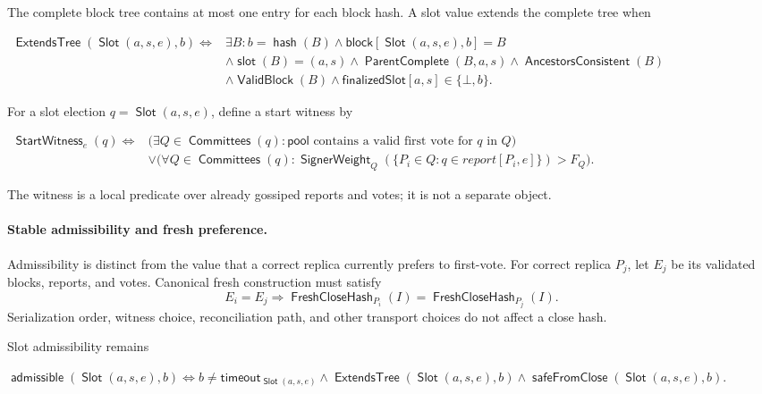 \documentclass[sigplan,twocolumn,review,anonymous]{acmart}
\newcommand{\func}[1]{\operatorname{\mathsf{#1}}}
\newcommand{\hash}{\func{hash}}
\newcommand{\Slot}{\func{Slot}}
\newcommand{\FreshCloseHash}{\func{FreshCloseHash}}
\newcommand{\admissible}{\func{admissible}}
\newcommand{\ExtendsTree}{\func{ExtendsTree}}
\newcommand{\ParentComplete}{\func{ParentComplete}}
\newcommand{\timeoutVal}{\mathsf{timeout}}
\newcommand{\blockMap}{\mathsf{block}}
\newcommand{\ValidBlock}{\func{ValidBlock}}
\newcommand{\slotOf}{\func{slot}}
\newcommand{\finalizedSlot}{\mathsf{finalizedSlot}}
\newcommand{\Committees}{\func{Committees}}
\newcommand{\safeFromClose}{\func{safeFromClose}}
\newcommand{\SignerWeight}{\func{SignerWeight}}
\begin{document}
The complete block tree contains at most one entry for each block hash.  A slot value extends the
complete tree when
\begin{center}
\begin{adjustbox}{max width=\columnwidth}
\(\displaystyle
\begin{aligned}
\ExtendsTree(\Slot(a,s,e),b)
\iff{}& \exists B: b=\hash(B)\wedge\blockMap[\Slot(a,s,e),b]=B\\
&\wedge\slotOf(B)=(a,s)\wedge\ParentComplete(B,a,s)
\wedge\func{AncestorsConsistent}(B)\\
&\wedge\ValidBlock(B)\wedge\finalizedSlot[a,s]\in\{\bot,b\}.
\end{aligned}
\)
\end{adjustbox}
\end{center}
For a slot election \(q=\Slot(a,s,e)\), define a start witness by
\begin{center}
\begin{adjustbox}{max width=\columnwidth}
\(\displaystyle
\begin{aligned}
\func{StartWitness}_e(q)\iff{}&
\bigl(\exists Q\in\Committees(q):\mathsf{pool}\text{ contains a valid first vote for }q\text{ in }Q\bigr)\\
&\vee\bigl(\forall Q\in\Committees(q):
\SignerWeight_Q(\{P_i\in Q:q\in report[P_i,e]\})>F_Q\bigr).
\end{aligned}
\)
\end{adjustbox}
\end{center}
The witness is a local predicate over already gossiped reports and votes; it is not a separate object.

\paragraph{Stable admissibility and fresh preference.}
Admissibility is distinct from the value that a correct replica currently prefers to first-vote.  For
correct replica \(P_j\), let \(E_j\) be its validated blocks, reports, and votes.  Canonical fresh
construction must satisfy
\[
E_i=E_j
\Longrightarrow
\FreshCloseHash_{P_i}(I)=\FreshCloseHash_{P_j}(I).
\]
Serialization order, witness choice, reconciliation path, and other transport choices do not affect a
close hash.

Slot admissibility remains
\begin{center}
\begin{adjustbox}{max width=\columnwidth}
\(\displaystyle
\admissible(\Slot(a,s,e),b)\iff
b\neq\timeoutVal_{\Slot(a,s,e)}\wedge\ExtendsTree(\Slot(a,s,e),b)
\wedge\safeFromClose(\Slot(a,s,e),b).
\)
\end{adjustbox}
\end{center}
\end{document}
